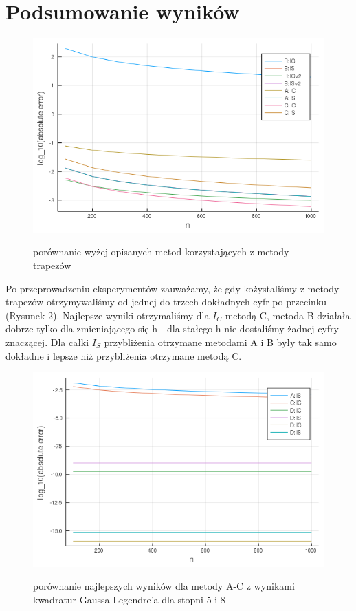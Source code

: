 \documentclass{article}
\begin{document}
\section*{Podsumowanie wyników}
\begin{figure}[ht]
    \includegraphics[scale=0.5]{WykresporownaniemetodABC.png}
    \label{wykresABC}
    \caption{porównanie wyżej opisanych metod korzystających z metody trapezów}
\end{figure}
Po przeprowadzeniu eksperymentów zauważamy, że gdy kożystaliśmy z metody trapezów otrzymywaliśmy od jednej do trzech dokładnych cyfr po przecinku (Rysunek 2). Najlepsze wyniki otrzymaliśmy dla $I_C$ metodą C, metoda B działała dobrze tylko dla zmieniającego się h - dla stałego h nie dostaliśmy żadnej cyfry znaczącej. Dla całki $I_S$ przybliżenia otrzymane metodami A i B były tak samo dokładne i lepsze niż przybliżenia otrzymane metodą C.
\begin{figure}[ht]
    \includegraphics[scale=0.5]{WykresporownaniemetodABC-D.png}
    \label{wykresABC-D}
    \caption{porównanie najlepszych wyników dla metody A-C z wynikami kwadratur Gaussa-Legendre'a dla stopni 5 i 8}
\end{figure}\\
\end{document}
